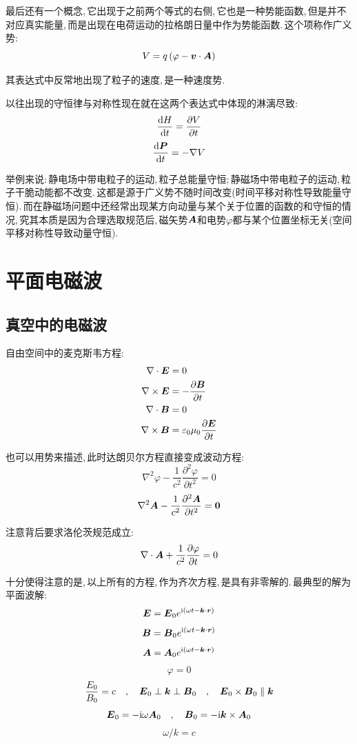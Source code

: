 最后还有一个概念,\,它出现于之前两个等式的右侧,\,它也是一种势能函数,\,但是并不对应真实能量,\,而是出现在电荷运动的拉格朗日量中作为势能函数.\,这个项称作广义势:
\[V=q\left(\varphi-\boldsymbol{v}\cdot\boldsymbol{A}\right)\]

其表达式中反常地出现了粒子的速度,\,是一种速度势.

以往出现的守恒律与对称性现在就在这两个表达式中体现的淋漓尽致:
\[\frac{\textrm{d} H}{\textrm{d} t}=\frac{\partial V}{\partial t}\]
\[\frac{\textrm{d} \boldsymbol{P}}{\textrm{d} t}=-\nabla V\]

举例来说:\,静电场中带电粒子的运动,\,粒子总能量守恒;\,静磁场中带电粒子的运动,\,粒子干脆动能都不改变.\,这都是源于广义势不随时间改变(时间平移对称性导致能量守恒).\,而在静磁场问题中还经常出现某方向动量与某个关于位置的函数的和守恒的情况,\,究其本质是因为合理选取规范后,\,磁矢势$\boldsymbol{A}$和电势$\varphi$都与某个位置坐标无关(空间平移对称性导致动量守恒).


\section{平面电磁波}

\subsection{真空中的电磁波}

自由空间中的麦克斯韦方程:
\begin{align*}
\nabla\cdot \boldsymbol{E} &=  0\\
\nabla\times \boldsymbol{E} &=   -\frac{\partial \boldsymbol{B}}{\partial t} \\
\nabla\cdot \boldsymbol{B} &=  0 \\
\nabla\times\boldsymbol{B} &= \varepsilon_0\mu_0\frac{\partial \boldsymbol{E}}{\partial t}
\end{align*}

也可以用势来描述,\,此时达朗贝尔方程直接变成波动方程:
\[\nabla^2\varphi-\frac{1}{c^2}\frac{\partial^2\varphi}{\partial t^2}=0\]
\[\nabla^2\boldsymbol{A}-\frac{1}{c^2}\frac{\partial^2\boldsymbol{A}}{\partial t^2}=\boldsymbol{0}\]

注意背后要求洛伦茨规范成立:
\[\nabla\cdot\boldsymbol{A}+\frac{1}{c^2}\frac{\partial \varphi}{\partial t}=0\]

十分使得注意的是,\,以上所有的方程,\,作为齐次方程,\,是具有非零解的.\,最典型的解为平面波解:
\[\boldsymbol{E}=\boldsymbol{E}_0e^{{\rm i}(\omega t-\boldsymbol{k}\cdot \boldsymbol{r})}\]
\[\boldsymbol{B}=\boldsymbol{B}_0e^{{\rm i}(\omega t-\boldsymbol{k}\cdot \boldsymbol{r})}\]
\[\boldsymbol{A}=\boldsymbol{A}_0e^{{\rm i}(\omega t-\boldsymbol{k}\cdot \boldsymbol{r})}\]
\[\varphi=0\]
\[\frac{E_0}{B_0}=c\quad,\quad  \boldsymbol{E}_0\perp\boldsymbol{k}\perp\boldsymbol{B}_0\quad,\quad \boldsymbol{E}_0\times\boldsymbol{B}_0\parallel \boldsymbol{k}\]
\[\boldsymbol{E}_0=-{\rm i} \omega \boldsymbol{A}_0\quad,\quad \boldsymbol{B}_0=-{\rm i}\boldsymbol{k}\times\boldsymbol{A}_0\]
\[\omega/k=c\]

